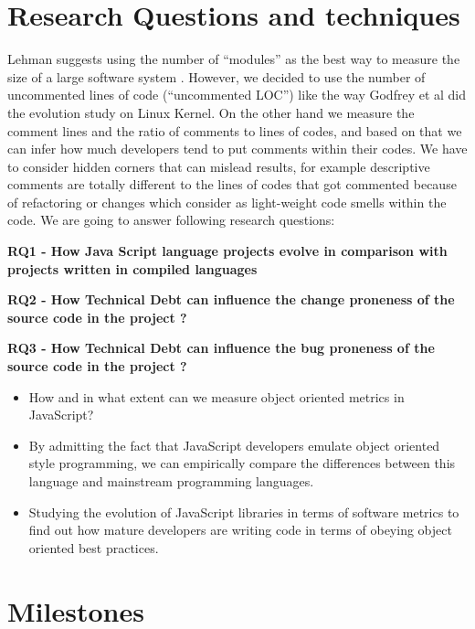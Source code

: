 \documentclass[conference]{IEEEtran}
\newcommand{\rqi}{\textbf{RQ1 - How Java Script language projects evolve in comparison with projects written in compiled languages}}
\newcommand{\rqii}{\textbf{RQ2  - How Technical Debt can influence the change proneness of the source code in the project ?}}
\newcommand{\rqiii}{\textbf{RQ3  - How Technical Debt can influence the bug proneness of the source code in the project ?}}
\begin{document}
	
	\section{Research Questions and techniques}
	Lehman suggests using the number of “modules” as the best way to measure the size of a large software system \cite{637156}. However, we decided to use the number of uncommented lines of code (“uncommented LOC”) like the way Godfrey et al \cite{883030} did the evolution study on Linux Kernel. On the other hand we measure the comment lines and the ratio of comments to lines of codes, and based on that we can infer how much developers tend to put comments within their codes. We have to consider hidden corners that can mislead results, for example descriptive comments are totally different to the lines of codes that got commented because of refactoring or changes which consider as light-weight code smells within the code.
	We are going to answer following research questions:
	
	
	\rqi
	
	
	
	\rqii
	
	
	
	\rqiii
	
	
	
	
		\begin{itemize}
			\item How and in what extent can we measure object oriented metrics in JavaScript?
			\item  By admitting the fact that JavaScript developers emulate object oriented style programming, we can empirically compare the differences between this language and mainstream programming languages.
			\item Studying the evolution of JavaScript libraries in terms of software metrics to find out how mature developers are writing code in terms of obeying object oriented best practices.
		\end{itemize}
	

	
	
	\label{sec:rq}
	
	\section{Milestones}
	
	
	
\end{document}
